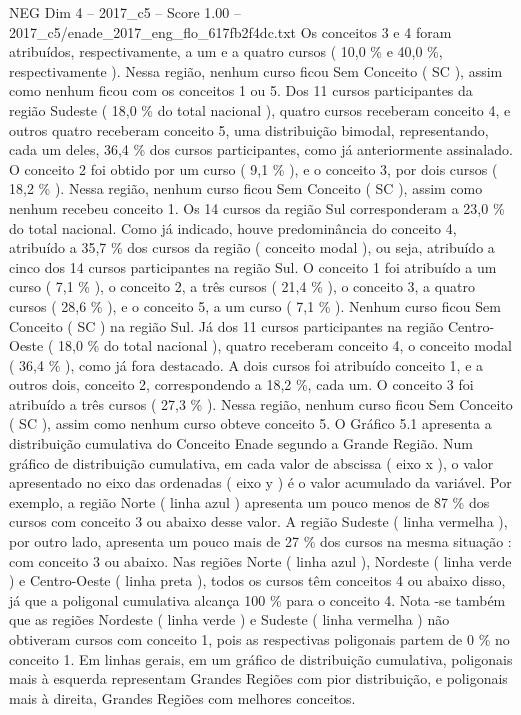 \begin{textsample}{NEG Dim 4 – 2017\_c5 – Score 1.00 – 2017\_c5/enade\_2017\_eng\_flo\_617fb2f4dc.txt}
Os conceitos 3 e 4 foram atribuídos, respectivamente, a um e a quatro cursos ( 10,0 \% e 40,0 \%, respectivamente ).
Nessa região, nenhum curso ficou Sem Conceito ( SC ), assim como nenhum ficou com os conceitos 1 ou 5.
Dos 11 cursos participantes da região Sudeste ( 18,0 \% do total nacional ), quatro cursos receberam conceito 4, e outros quatro receberam conceito 5, uma distribuição bimodal, representando, cada um deles, 36,4 \% dos cursos participantes, como já anteriormente assinalado.
O conceito 2 foi obtido por um curso ( 9,1 \% ), e o conceito 3, por dois cursos ( 18,2 \% ).
Nessa região, nenhum curso ficou Sem Conceito ( SC ), assim como nenhum recebeu conceito 1.
Os 14 cursos da região Sul corresponderam a 23,0 \% do total nacional.
Como já indicado, houve predominância do conceito 4, atribuído a 35,7 \% dos cursos da região ( conceito modal ), ou seja, atribuído a cinco dos 14 cursos participantes na região Sul.
O conceito 1 foi atribuído a um curso ( 7,1 \% ), o conceito 2, a três cursos ( 21,4 \% ), o conceito 3, a quatro cursos ( 28,6 \% ), e o conceito 5, a um curso ( 7,1 \% ).
Nenhum curso ficou Sem Conceito ( SC ) na região Sul.
Já dos 11 cursos participantes na região Centro-Oeste ( 18,0 \% do total nacional ), quatro receberam conceito 4, o conceito modal ( 36,4 \% ), como já fora destacado.
A dois cursos foi atribuído conceito 1, e a outros dois, conceito 2, correspondendo a 18,2 \%, cada um.
O conceito 3 foi atribuído a três cursos ( 27,3 \% ).
Nessa região, nenhum curso ficou Sem Conceito ( SC ), assim como nenhum curso obteve conceito 5.
O Gráfico 5.1 apresenta a distribuição cumulativa do Conceito Enade segundo a Grande Região.
Num gráfico de distribuição cumulativa, em cada valor de abscissa ( eixo x ), o valor apresentado no eixo das ordenadas ( eixo y ) é o valor acumulado da variável.
Por exemplo, a região Norte ( linha azul ) apresenta um pouco menos de 87 \% dos cursos com conceito 3 ou abaixo desse valor.
A região Sudeste ( linha vermelha ), por outro lado, apresenta um pouco mais de 27 \% dos cursos na mesma situação : com conceito 3 ou abaixo.
Nas regiões Norte ( linha azul ), Nordeste ( linha verde ) e Centro-Oeste ( linha preta ), todos os cursos têm conceitos 4 ou abaixo disso, já que a poligonal cumulativa alcança 100 \% para o conceito 4.
Nota -se também que as regiões Nordeste ( linha verde ) e Sudeste ( linha vermelha ) não obtiveram cursos com conceito 1, pois as respectivas poligonais partem de 0 \% no conceito 1.
Em linhas gerais, em um gráfico de distribuição cumulativa, poligonais mais à esquerda representam Grandes Regiões com pior distribuição, e poligonais mais à direita, Grandes Regiões com melhores conceitos.

\end{textsample}
